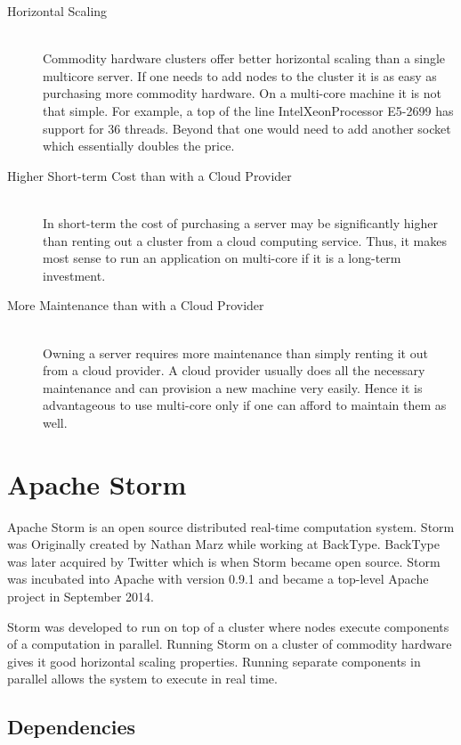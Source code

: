 \documentclass[bsc,logo,frontabs,twoside,singlespacing,normalheadings,parskip]{infthesis}\usepackage[]{graphicx}\usepackage[]{color}
\begin{document}
\begin{description}
	\item[Horizontal Scaling] \hfill \\
	Commodity hardware clusters offer better horizontal scaling than a single multicore server. If one needs to add nodes to the cluster it is as easy as purchasing more commodity hardware. On a multi-core machine it is not that simple. For example, a top of the line Intel\textregistered Xeon\textregistered Processor E5-2699 has support for 36 threads. Beyond that one would need to add another socket which essentially doubles the price.
	\item[Higher Short-term Cost than with a Cloud Provider] \hfill \\
	In short-term the cost of purchasing a server may be significantly higher than renting out a cluster from a cloud computing service. Thus, it makes most sense to run an application on multi-core if it is a long-term investment.
	\item[More Maintenance than with a Cloud Provider] \hfill \\
	Owning a server requires more maintenance than simply renting it out from a cloud provider. A cloud provider usually does  all the necessary maintenance and can provision a new machine very easily. Hence it is advantageous to use multi-core only if one can afford to maintain them as well.
\end{description}

\section{Apache Storm}
\label{sec:apache_storm}

Apache Storm is an open source distributed real-time computation system. Storm was Originally created by Nathan Marz while working at BackType. \cite{NathanAbout} BackType was later acquired by Twitter which is when Storm became open source. Storm was incubated into Apache with version 0.9.1 and became a top-level Apache project in September 2014.

Storm was developed to run on top of a cluster where nodes execute components of a computation in parallel. Running Storm on a cluster of commodity hardware gives it good horizontal scaling properties. Running separate components in parallel allows the system to execute in real time.

\subsection{Dependencies}
\end{document}
